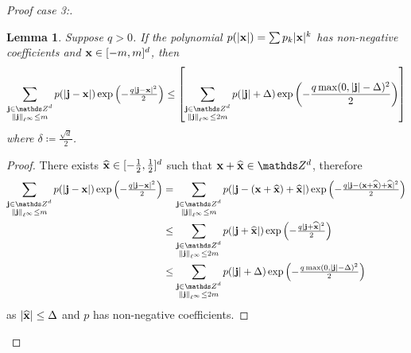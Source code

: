 \documentclass[10pt,a4paper,onecolumn]{article}
\numberwithin{equation}{section}
\newtheorem{lemma}{Lemma}[section]\newtheorem{example}{Example}[section]
\let\F\mathds\let\C\mathcal\newcommand{\R}{\F{R}}\newcommand{\A}{\C{A}}
\newcommand{\norm}[1]{{\left\lVert #1 \right\rVert}}
\renewcommand{\vec}{\mathbf}
\newcommand{\UCmath}[1]{%
	\begingroup
	\ucmathlist\uppercase\expandafter{#1}%
	\endgroup
}
\newcommand{\ucmathlist}{%
	\def\alpha{\mathrm{A}}%
	\def\beta{\mathrm{B}}%
	\let\gamma=\Gamma
	\let\delta=\Delta
	\def\epsilon{\mathrm{E}}%
	\def\varepsilon{\mathrm{E}}%
	\def\zeta{\mathrm{Z}}%
	\def\eta{\mathrm{H}}%
	\let\theta=\Theta
	\let\vartheta=\Theta
	\def\iota{\mathrm{I}}%
	\def\kappa{\mathrm{K}}%
	\let\lambda=\Lambda
	\def\mu{\mathrm{M}}%
	\def\nu{\mathrm{N}}%
	\let\xi=\Xi
	\let\pi=\Pi
	\let\varpi=\Pi
	\def\rho{\mathrm{P}}%
	\def\varrho{\mathrm{P}}%
	\let\sigma=\Sigma
	\def\tau{\mathrm{T}}%
	\let\upsilon=\Upsilon
	\let\phi=\Phi
	\let\varphi=\Phi
	\def\chi{\mathrm{X}}%
	\let\psi=\Psi
	\let\omega=\Omega
}
\newcommand{\caps}[1]{\UCmath{#1}}
\newcommand*{\varx}[1]{%
	\IfEqCase{#1}{%
		{0}{x}%
		{1}{y}%
		{2}{z}%
		{3}{r}%
	}[x#1]%
}
\newcommand*{\Varx}[1]{\caps{\varx{#1}}}
\newcommand*{\vvarx}[1]{\vec{\varx{#1}}}\newcommand*{\vVarx}[1]{\vec{\Varx{#1}}}
\begin{document}
\begin{proof}[Proof case 3:]
	\begin{lemma}\label{app: exp sum bound}
		Suppose $q>0$. If the polynomial $p(|\vvarx0|) = \sum p_k|\vvarx0|^k$ has non-negative coefficients and $\vvarx0\in[-m,m]^d$, then
		$$\sum_{\substack{\vec{j}\in\F Z^d\\\norm{\vec{j}}_{\ell^\infty}\leq m}} p(|\vec{j}-\vvarx0|)\exp\left(-\tfrac{q|\vec{j}-\vvarx0|^2}{2}\right)\leq \left[\sum_{\substack{\vec{j}\in\F Z^d\\\norm{\vec{j}}_{\ell^\infty}\leq2m}}p(|\vec{j}|+\delta)\exp\left(-\frac{q\max(0,|\vec{j}|-\delta)^2}{2}\right)\right]$$
		where $\delta\coloneqq \frac{\sqrt{d}}{2}$.
	\end{lemma}
	\begin{proof}
		There exists $\hat{\vvarx0}\in[-\tfrac12,\tfrac12]^d$ such that $\vvarx0 + \hat{\vvarx0}\in\F Z^d$, therefore
		\begin{align*}
			\sum_{\substack{\vec{j}\in\F Z^d\\\norm{\vec{j}}_{\ell^\infty}\leq m}} p(|\vec{j}-\vvarx0|)\exp\left(-\tfrac{q|\vec{j}-\vvarx0|^2}{2}\right) &= \sum_{\substack{\vec{j}\in\F Z^d\\\norm{\vec{j}}_{\ell^\infty}\leq m}} p(|\vec{j}-(\vvarx0+\hat{\vvarx0})+\hat{\vvarx0}|)\exp\left(-\tfrac{q|\vec{j}-(\vvarx0+\hat{\vvarx0})+\hat{\vvarx0}|^2}{2}\right)
			\\&\leq \sum_{\substack{\vec{j}\in\F Z^d\\\norm{\vec{j}}_{\ell^\infty}\leq2m}} p(|\vec{j}+\hat{\vvarx0}|)\exp\left(-\tfrac{q|\vec{j}+\hat{\vvarx0}|^2}{2}\right)
			\\&\leq \sum_{\substack{\vec{j}\in\F Z^d\\\norm{\vec{j}}_{\ell^\infty}\leq2m}} p(|\vec{j}|+\delta)\exp\left(-\tfrac{q\max(0,|\vec{j}|-\delta)^2}{2}\right)
		\end{align*}
		as $|\hat{\vvarx0}|\leq \delta$ and $p$ has non-negative coefficients. 
	\end{proof}
	

\end{proof}
\end{document}
